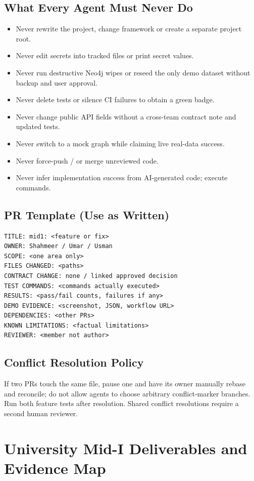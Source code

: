 \documentclass[11pt,a4paper,oneside]{report}
\newcommand{\file}[1]{\path{#1}}
\begin{document}
\section{What Every Agent Must Never Do}
\begin{itemize}
\item Never rewrite the project, change framework or create a separate project root.
\item Never edit \file{.env} secrets into tracked files or print secret values.
\item Never run destructive Neo4j wipes or reseed the only demo dataset without backup and user approval.
\item Never delete tests or silence CI failures to obtain a green badge.
\item Never change public API fields without a cross-team contract note and updated tests.
\item Never switch to a mock graph while claiming live real-data success.
\item Never force-push \file{main}/\file{develop} or merge unreviewed code.
\item Never infer implementation success from AI-generated code; execute commands.
\end{itemize}

\section{PR Template (Use as Written)}
\begin{lstlisting}
TITLE: mid1: <feature or fix>
OWNER: Shahmeer / Umar / Usman
SCOPE: <one area only>
FILES CHANGED: <paths>
CONTRACT CHANGE: none / linked approved decision
TEST COMMANDS: <commands actually executed>
RESULTS: <pass/fail counts, failures if any>
DEMO EVIDENCE: <screenshot, JSON, workflow URL>
DEPENDENCIES: <other PRs>
KNOWN LIMITATIONS: <factual limitations>
REVIEWER: <member not author>
\end{lstlisting}

\section{Conflict Resolution Policy}
If two PRs touch the same file, pause one and have its owner manually rebase and reconcile; do not allow agents to choose arbitrary conflict-marker branches. Run both feature tests after resolution. Shared conflict resolutions require a second human reviewer.

\chapter{University Mid-I Deliverables and Evidence Map}
\end{document}
